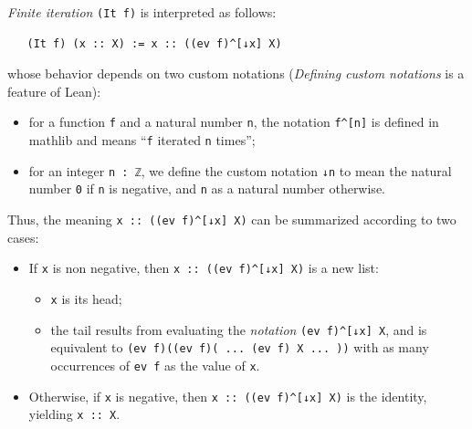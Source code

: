 \documentclass[preprint]{elsarticle}
\theoremstyle{remark}
\newcommand{\MATHLIB}{\textsf{mathlib}\xspace}
\newcommand{\LEAN}{\textsf{Lean}\xspace}
\begin{document}
\vspace{\baselineskip}
\noindent
\emph{Finite iteration} \lstinline|(It f)| is interpreted as follows:
\begin{lstlisting}
   (It f) (x :: X) := x :: ((ev f)^[↓x] X)
\end{lstlisting}
whose behavior depends on two custom notations (\emph{Defining custom notations} is a feature of \LEAN):
\begin{itemize}
    \item for a function \lstinline|f| and a natural number \lstinline|n|, the notation \lstinline|f^[n]| is defined in \MATHLIB and means ``\lstinline|f| iterated \lstinline|n| times'';
    \item for an integer \lstinline|n : ℤ|, we define the custom notation \lstinline|↓n| to mean the natural number \lstinline|0| if \lstinline|n| is negative, and \lstinline|n| as a natural number otherwise.
\end{itemize}
Thus, the meaning \lstinline|x :: ((ev f)^[↓x] X)| can be summarized according to two cases:
\begin{itemize}
    \item If \lstinline|x| is non negative, then \lstinline|x :: ((ev f)^[↓x] X)| is a new list:
    \begin{itemize}
        \item \lstinline|x| is its head;
        \item the tail results from evaluating the \emph{notation} \lstinline|(ev f)^[↓x] X|, and is equivalent to \lstinline|(ev f)((ev f)( ... (ev f) X ... ))| with as many occurrences of \lstinline|ev f| as the value of \lstinline|x|.
    \end{itemize}
    \item Otherwise, if \lstinline|x| is negative, then \lstinline|x :: ((ev f)^[↓x] X)| is the identity, yielding \lstinline|x :: X|.
\end{itemize}
\end{document}
